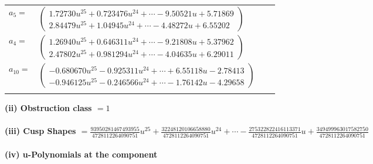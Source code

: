 \documentclass[1p]{elsarticle_modified}
\theoremstyle{definition}
\begin{document}
\begin{tabular}{m{7pt} m{180pt} m{7pt} m{180pt} }
\flushright $a_{5}=$&$\begin{pmatrix}1.72730 u^{25}+0.723476 u^{24}+\cdots-9.50521 u+5.71869\\2.84479 u^{25}+1.04945 u^{24}+\cdots-4.48272 u+6.55202\end{pmatrix}$ \\
\flushright $a_{4}=$&$\begin{pmatrix}1.26940 u^{25}+0.646311 u^{24}+\cdots-9.21808 u+5.37962\\2.47802 u^{25}+0.981294 u^{24}+\cdots-4.04635 u+6.29011\end{pmatrix}$ \\
\flushright $a_{10}=$&$\begin{pmatrix}-0.680670 u^{25}-0.925311 u^{24}+\cdots+6.55118 u-2.78413\\-0.946125 u^{25}-0.246566 u^{24}+\cdots-1.76142 u-4.29658\end{pmatrix}$\\&\end{tabular}
\flushleft \textbf{(ii) Obstruction class $= 1$}\\~\\
\flushleft \textbf{(iii) Cusp Shapes $= \frac{93950281467493955}{4728112264090751} u^{25}+\frac{32248120106658880}{4728112264090751} u^{24}+\cdots-\frac{275322822416113371}{4728112264090751} u+\frac{349499963017582750}{4728112264090751}$}\\~\\
\newpage\renewcommand{\arraystretch}{1}
\flushleft \textbf{(iv) u-Polynomials at the component}\newline \\
\end{document}
